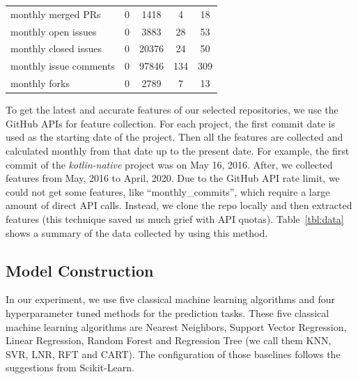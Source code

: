 \documentclass[smallextended]{svjour3}
\begin{document}
\begin{table}[!t]
\begin{adjustbox}{max width=0.92\textwidth}
\begin{tabular}{l|cccc}
\rowcolor[HTML]{F3F3F3} 
{\color[HTML]{000000} monthly merged PRs} & {\color[HTML]{000000} 0} & {\color[HTML]{000000} 1418} & {\color[HTML]{000000} 4} & {\color[HTML]{000000} 18} \\
\rowcolor[HTML]{FFFFFF} 
{\color[HTML]{000000} monthly open issues} & {\color[HTML]{000000} 0} & {\color[HTML]{000000} 3883} & {\color[HTML]{000000} 28} & {\color[HTML]{000000} 53} \\
\rowcolor[HTML]{F3F3F3} 
{\color[HTML]{000000} monthly closed issues} & {\color[HTML]{000000} 0} & {\color[HTML]{000000} 20376} & {\color[HTML]{000000} 24} & {\color[HTML]{000000} 50} \\
\rowcolor[HTML]{FFFFFF} 
{\color[HTML]{000000} monthly issue comments} & {\color[HTML]{000000} 0} & {\color[HTML]{000000} 97846} & {\color[HTML]{000000} 134} & {\color[HTML]{000000} 309} \\
\rowcolor[HTML]{F3F3F3} 
{\color[HTML]{000000} monthly forks} & {\color[HTML]{000000} 0} & {\color[HTML]{000000} 2789} & {\color[HTML]{000000} 7} & {\color[HTML]{000000} 13}
\end{tabular}
\end{adjustbox}
\end{table}



To get the latest and accurate features
of our selected repositories,  we use the GitHub APIs for feature collection. For each project, the first commit date is
used as the starting date of the project. Then all the features are collected and calculated monthly
from that date up to the present date. For example, the first commit of
the {\it kotlin-native} project was on May 16,  2016.
After, we collected  features from May, 2016 to April, 2020. Due to the GitHub API rate limit, we could not get some features, like ``monthly\_commits'', which require a large amount of direct API calls. Instead, we clone the repo locally and then extracted   features (this technique saved us much grief with API  quotas). 
Table~\ref{tbl:data} shows a summary of the data collected by using this method. 

\subsection{Model Construction}
In our experiment, we use five classical machine learning algorithms and four hyperparameter tuned methods for the prediction tasks. These five classical machine learning algorithms are Nearest Neighbors, Support Vector Regression, Linear Regression, Random Forest and Regression Tree (we call them KNN, SVR, LNR, RFT and CART). The configuration of those baselines follows the suggestions from Scikit-Learn.
\end{document}
